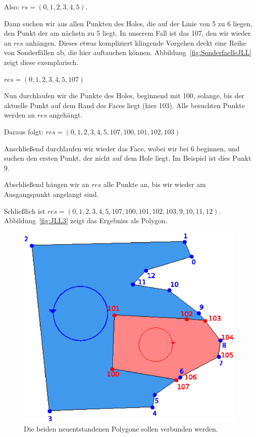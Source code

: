 Also: $rs=(0, 1, 2, 3, 4, 5)$.

Dann suchen wir aus allen Punkten des Holes, die auf der Linie von 5 zu 6 liegen, den Punkt der am nächstn zu 5 liegt. In unserem Fall ist das 107, den wir wieder an $res$ anhängen. Dieses etwas kompliziert klingende Vorgehen deckt eine Reihe von Sonderfällen ab, die hier auftauchen können. Abbildung~\ref{fig:SonderfaelleJLL} zeigt diese exemplarisch.

$res=(0, 1, 2, 3, 4, 5, 107)$

Nun durchlaufen wir die Punkte des Holes, beginnend mit 100, solange, bis der aktuelle Punkt auf dem Rand des Faces liegt (hier 103). Alle besuchten Punkte werden an $res$ angehängt.

Daraus folgt: $res=(0, 1, 2, 3, 4, 5, 107, 100, 101, 102, 103)$

Anschließend durchlaufen wir wieder das Face, wobei wir bei 6 beginnen, und suchen den ersten Punkt, der nicht auf dem Hole liegt. Im Beispiel ist dies Punkt 9.

Abschließend hängen wir an $res$ alle Punkte an, bis wir wieder am Ausgangspunkt angelangt sind.

Schließlich ist $res=(0, 1, 2, 3, 4, 5, 107, 100, 101, 102, 103, 9, 10, 11, 12)$. Abbildung~\ref{fig:JLL3} zeigt das Ergebniss als Polygon.


\begin{figure}
	\centering
	\includegraphics[scale=0.6]{JLL2.svg.eps}
	\caption{Die beiden neuentstandenen Polygone sollen verbunden werden.}
	\label{fig:JLL2}
\end{figure}


